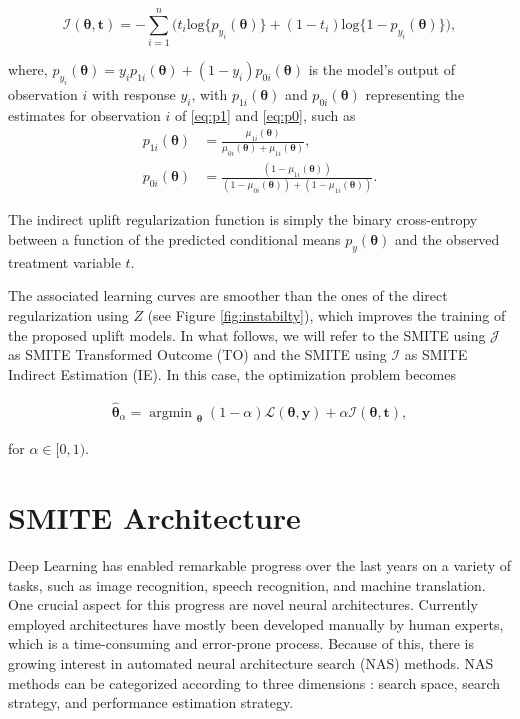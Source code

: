 \documentclass{article}
\def\tt{\mathbf t}
\def\y{\mathbf y}
\DeclareMathOperator*{\argmin}{argmin~} %
\begin{document}
\begin{equation*}
    \mathcal{I}(\boldsymbol{\theta}, 
    \tt) =   - \sum_{i=1}^{n} \Big( t_i\mathrm{log} \{p_{y_i}(\boldsymbol{\theta})\} + (1-t_i) \mathrm{log} \{1-p_{y_i}(\boldsymbol{\theta})\} \Big),
\end{equation*}

where, $p_{y_i}(\boldsymbol{\theta}) = y_i p_{1i}(\boldsymbol{\theta}) + (1-y_i) p_{0i}(\boldsymbol{\theta})$ is the model's output of observation $i$ with response $y_i$, with $p_{1i}(\boldsymbol{\theta})$ and $p_{0i}(\boldsymbol{\theta})$  representing the estimates for observation $i$ of \eqref{eq:p1} and \eqref{eq:p0}, such as
\begin{align*}
    p_{1i}(\boldsymbol{\theta}) &= \frac{\mu_{1i}(\boldsymbol{\theta})}{\mu_{0i}(\boldsymbol{\theta}) +\mu_{1i}(\boldsymbol{\theta})}, \\
    p_{0i}(\boldsymbol{\theta}) &= \frac{(1-\mu_{1i}(\boldsymbol{\theta}))}{(1-\mu_{0i}(\boldsymbol{\theta})) +(1- \mu_{1i}(\boldsymbol{\theta}))}.
\end{align*}


The indirect uplift regularization function is simply the binary cross-entropy between a function of the predicted conditional means $p_y(\boldsymbol{\theta})$ and the observed treatment variable $t$. 

The associated learning curves are smoother than the ones of the direct regularization using $Z$ (see Figure \ref{fig:instabilty}), which improves the training of the proposed uplift models. In what follows, we will refer to the SMITE using $\mathcal{J}$ as SMITE Transformed Outcome (TO) and the SMITE using  $\mathcal{I}$ as SMITE Indirect Estimation (IE). In this case, the optimization problem becomes

\begin{align*}
    {\boldsymbol{\hat\theta}}_{\alpha} = \argmin_{\boldsymbol{\theta}} (1 - \alpha)  \mathcal{L}(\boldsymbol{\theta}, \y) + \alpha \mathcal{I}(\boldsymbol{\theta}, \tt),
\end{align*}

for $\alpha \in [0,1)$.





\section{SMITE Architecture}
\label{sec:NAS}

Deep Learning has enabled remarkable progress over the last years on a variety of tasks, such as image recognition, speech recognition, and machine translation. One crucial aspect
for this progress are novel neural architectures. Currently employed architectures have mostly been developed manually by human experts, which is a time-consuming and error-prone process. Because of this, there is growing interest in automated neural architecture search (NAS) methods. NAS methods can be categorized according to three dimensions \citep{elsken2018neural}: search space, search strategy, and performance estimation strategy.
\end{document}

